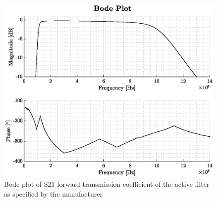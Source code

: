 \begin{figure}[htbp]
	\centering
	\includegraphics[width=.8\textwidth]{Figures/3_bpf_s21_vals.eps}
	\caption{Bode plot of S21 forward transmission coefficient of the active filter as specified by the manufacturer}
	\label{fig:3_bpf_s21_bode_plot}
\end{figure}


